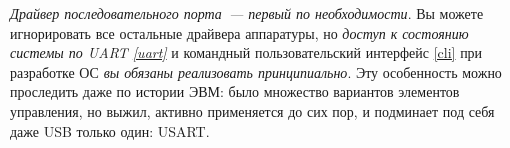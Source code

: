 \clearpage
{}\secdown

\emph{Драйвер последовательного порта\ --- первый по необходимости}. Вы можете
игнорировать все остальные драйвера аппаратуры, но \emph{доступ к состоянию
системы по UART \ref{uart}} и командный пользовательский интерфейс \ref{cli} при
разработке ОС \emph{вы обязаны реализовать принципиально}. 
Эту особенность можно проследить даже по истории ЭВМ: было множество вариантов
элементов управления, но выжил, активно применяется до сих пор, и подминает под себя даже USB только один: USART.

\secup
